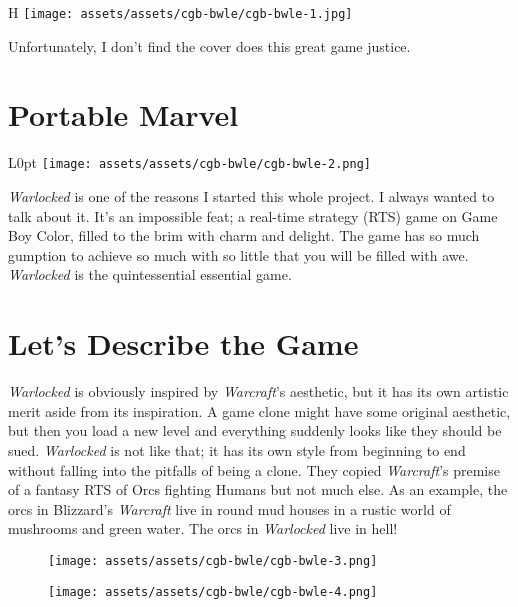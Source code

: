\documentclass{book}
\begin{document}
\begin{wrapfigure}{H}{\linewidth}
\vskip 4pt
\centering \texttt{[image: assets/assets/cgb-bwle/cgb-bwle-1.jpg]}\par\pagetwodescription Unfortunately, I don’t find the cover does this great game justice.\end{wrapfigure}
\clearpage

\FloatBarrier\needspace{10mm}\section*{Portable Marvel}\nopagebreak[4]

\begin{wrapfigure}{L}{0pt} \texttt{[image: assets/assets/cgb-bwle/cgb-bwle-2.png]}\end{wrapfigure}
\emph{Warlocked} is one of the reasons I started this whole project. I always wanted to talk about it. It’s an impossible feat; a real-time strategy (RTS) game on Game Boy Color, filled to the brim with charm and delight. The game has so much gumption to achieve so much with so little that you will be filled with awe. \emph{Warlocked} is the quintessential essential game.

\FloatBarrier\needspace{10mm}\section*{Let’s Describe the Game}\nopagebreak[4]

\emph{Warlocked} is obviously inspired by \emph{Warcraft}’s aesthetic, but it has its own artistic merit aside from its inspiration. A game clone might have some original aesthetic, but then you load a new level and everything suddenly looks like they should be sued. \emph{Warlocked} is not like that; it has its own style from beginning to end without falling into the pitfalls of being a clone. They copied \emph{Warcraft}’s premise of a fantasy RTS of Orcs fighting Humans but not much else. As an example, the orcs in Blizzard’s \emph{Warcraft} live in round mud houses in a rustic world of mushrooms and green water. The orcs in \emph{Warlocked} live in hell!

\begin{figure}[hbt]
\vskip 10pt
\centering \texttt{[image: assets/assets/cgb-bwle/cgb-bwle-3.png]}
\vskip 6pt
\end{figure}
\begin{figure}[hbt]
\vskip 10pt
\centering \texttt{[image: assets/assets/cgb-bwle/cgb-bwle-4.png]}
\vskip 6pt
\end{figure}
\end{document}
